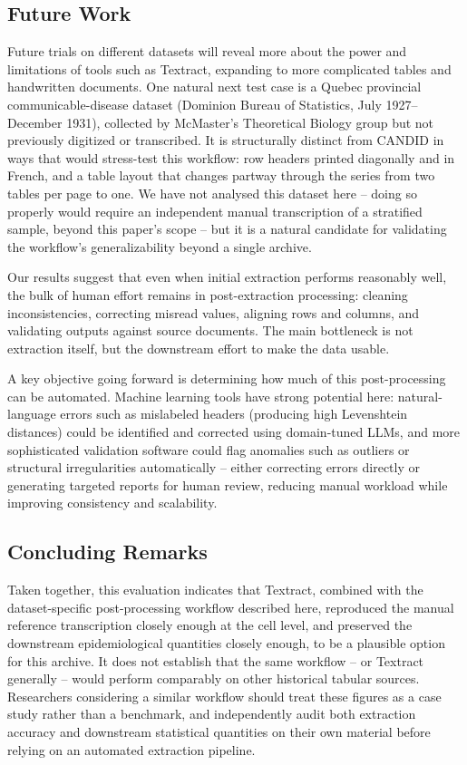 \documentclass[12pt]{article}
\begin{document}
\subsection{Future Work}\label{sec:futurework}

Future trials on different datasets will reveal more about the power and limitations of tools such as Textract, expanding to more complicated tables and handwritten documents. One natural next test case is a Quebec provincial communicable-disease dataset (Dominion Bureau of Statistics, July 1927--December 1931), collected by McMaster's Theoretical Biology group but not previously digitized or transcribed. It is structurally distinct from CANDID in ways that would stress-test this workflow: row headers printed diagonally and in French, and a table layout that changes partway through the series from two tables per page to one. We have not analysed this dataset here -- doing so properly would require an independent manual transcription of a stratified sample, beyond this paper's scope -- but it is a natural candidate for validating the workflow's generalizability beyond a single archive.

Our results suggest that even when initial extraction performs reasonably well, the bulk of human effort remains in post-extraction processing: cleaning inconsistencies, correcting misread values, aligning rows and columns, and validating outputs against source documents. The main bottleneck is not extraction itself, but the downstream effort to make the data usable.

A key objective going forward is determining how much of this post-processing can be automated. Machine learning tools have strong potential here: natural-language errors such as mislabeled headers (producing high Levenshtein distances) could be identified and corrected using domain-tuned LLMs, and more sophisticated validation software could flag anomalies such as outliers or structural irregularities automatically -- either correcting errors directly or generating targeted reports for human review, reducing manual workload while improving consistency and scalability.

\subsection{Concluding Remarks}

Taken together, this evaluation indicates that Textract, combined with the dataset-specific post-processing workflow described here, reproduced the manual reference transcription closely enough at the cell level, and preserved the downstream epidemiological quantities closely enough, to be a plausible option for this archive. It does not establish that the same workflow -- or Textract generally -- would perform comparably on other historical tabular sources. Researchers considering a similar workflow should treat these figures as a case study rather than a benchmark, and independently audit both extraction accuracy and downstream statistical quantities on their own material before relying on an automated extraction pipeline.
\end{document}
